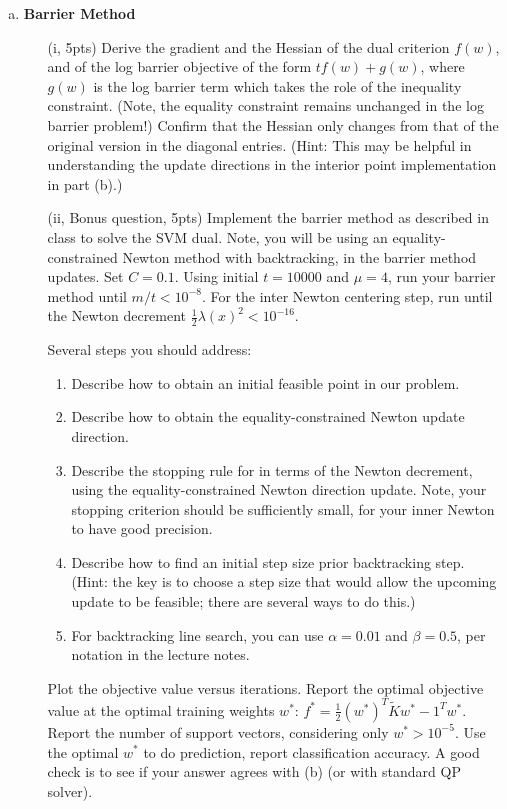 \documentclass{article}
\theoremstyle{remark}
\theoremstyle{definition}
\begin{document}
\begin{enumerate}[(a)]

\item \textbf{Barrier Method} 
  \begin{enumerate}[(i)]

  \item[(i, 5pts)] Derive the gradient and the Hessian of the dual criterion $f(w)$, and of
    the log barrier objective of the form $tf(w) + g(w)$, where $g(w)$ is the
    log barrier term which takes the role of the inequality constraint. (Note,
    the equality constraint remains unchanged in the log barrier problem!)
    Confirm that the Hessian only changes from that of the original version in
    the diagonal entries. (Hint: This may be helpful in understanding the update
    directions in the interior point implementation in part (b).)
  \item[(ii, Bonus question, 5pts)] Implement the barrier method as described in
    class to solve the SVM dual. Note, you will be using an equality-constrained
    Newton method with backtracking, in the barrier method updates. Set $C=0.1$. Using
    initial $t=10000$ and $\mu=4$, run your barrier method until
    $m/t < 10^{-8}$. For the inter Newton centering step, run until the Newton decrement $\tfrac1{2} \lambda(x)^2 < 10^{-16}$.
    
    Several steps you should address:
    \begin{enumerate}[1)]
      \item Describe how to obtain an initial feasible point in our problem.
      \item Describe how to obtain the equality-constrained Newton update
        direction.
      \item Describe the stopping rule for in terms of the Newton decrement,
        using the equality-constrained Newton direction update. Note, your
        stopping criterion should be sufficiently small, for your inner Newton
        to have good precision.
      \item Describe how to find an initial step size prior backtracking
        step. (Hint: the key is to choose a step size that would allow the
        upcoming update to be feasible; there are several ways to do this.)
      \item For backtracking line search, you can use $\alpha = 0.01$ and
        $\beta = 0.5$, per notation in the lecture notes.
    \end{enumerate}
    Plot the objective value versus iterations.
    Report the optimal objective value at the optimal training weights $w^*$:
    $f^* = \frac{1}{2}(w^*)^T\tilde{K}w^* - 1^Tw^*$. Report the number of
    support vectors, considering only $w^* > 10^{-5}$. Use the optimal
    $w^*$ to do prediction, report classification accuracy. A good
    check is to see if your answer agrees with (b) (or with standard QP solver).
  \end{enumerate}





\end{enumerate}
\end{document}
